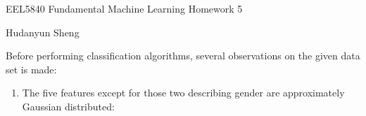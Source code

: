 \documentclass[a4paper]{article}
\begin{document}
\begin{spacing}{2.0}
\begin{flushleft}\begin{huge}EEL5840 Fundamental Machine Learning   Homework 5\end{huge}\end{flushleft}
\begin{flushright}\begin{Large} Hudanyun Sheng \end{Large}\end{flushright}


Before performing classification algorithms, several  observations on the given data set is made: 
\begin{enumerate}
\item The five features except for those two describing gender are approximately Gaussian distributed:


\end{enumerate}
\end{spacing}
\end{document}
